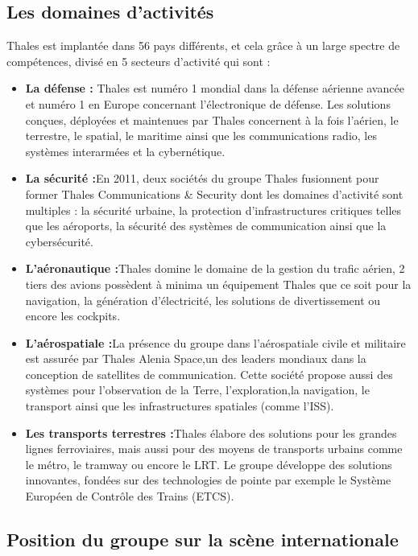\subsection{Les domaines d'activités}

Thales est implantée dans 56 pays différents, et cela grâce à un large spectre de compétences, divisé en 5 secteurs d'activité qui sont :
\begin{itemize}
\item \textbf{La défense : }Thales est numéro 1 mondial dans la défense aérienne avancée et numéro 1 en Europe concernant l'électronique de défense. Les solutions conçues, déployées et maintenues par Thales concernent à la fois l'aérien, le terrestre, le spatial, le maritime ainsi que les communications radio, les systèmes interarmées et la cybernétique.
\item \textbf{La sécurité :}En 2011, deux sociétés du groupe Thales fusionnent pour former Thales Communications \& Security dont les domaines d'activité sont multiples : la sécurité urbaine, la protection d'infrastructures critiques telles que les aéroports, la sécurité des systèmes de communication ainsi que la cybersécurité.
\item \textbf{L'aéronautique :}Thales domine le domaine de la gestion du trafic aérien, 2 tiers des avions possèdent à minima un équipement Thales que ce soit pour la navigation, la génération d'électricité, les solutions de divertissement ou encore les cockpits.
\item \textbf{L'aérospatiale :}La présence du groupe dans l'aérospatiale civile et militaire est assurée par Thales Alenia Space,un des leaders mondiaux dans la conception de satellites de communication. Cette société propose aussi des systèmes pour l'observation de la Terre, l'exploration,la navigation, le transport ainsi que les infrastructures spatiales (comme l'ISS).

\item \textbf{Les transports terrestres :}Thales élabore des solutions pour les grandes lignes ferroviaires, mais aussi pour des moyens de transports urbains comme le métro, le tramway ou encore le \gls{LRT}.
Le groupe développe des solutions innovantes, fondées sur des technologies de pointe par exemple le Système Européen de Contrôle des Trains (ETCS).
\end{itemize}


\subsection{Position du groupe sur la scène internationale}

